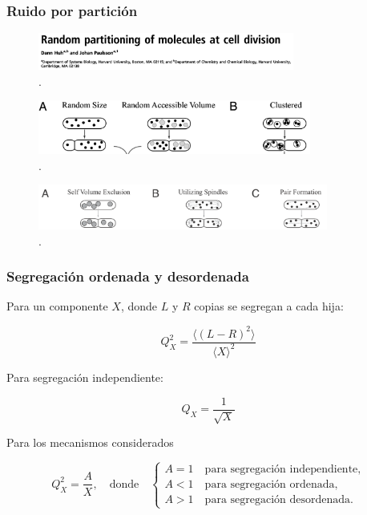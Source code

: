 \documentclass[xcolor=dvipsnames]{beamer}
\begin{document}
\begin{frame}
\frametitle{Ruido por partici\'on}
\begin{figure}[p]
    \centering
    \includegraphics[width=0.75\textwidth]{huh11.png}\\
    \tiny \cite{huh11b}.
\end{figure}

\begin{figure}[p]
    \centering
    \includegraphics[width=0.8\textwidth]{order.png}\\
    \tiny \cite{huh11b}.
\end{figure}

\begin{figure}[p]
    \centering
    \includegraphics[width=0.85\textwidth]{disorder.png}\\
    \tiny \cite{huh11b}.
\end{figure}

\end{frame}

\begin{frame}
\frametitle{Segregaci\'on ordenada y desordenada}

Para un componente $X$, donde $L$ y $R$ copias se segregan a cada hija:

$$Q_X^2 = \frac{\langle (L-R)^2 \rangle}{\langle X \rangle^2} $$

Para segregaci\'on independiente:

$$Q_X = \frac{1}{\sqrt{X}} $$

Para los mecanismos considerados

$$ Q_X^2 = \frac{A}{X}, \quad \text{donde} \quad 
\begin{cases}
A = 1 \quad \text{para segregaci\'on independiente,}\\
A < 1 \quad \text{para segregaci\'on ordenada,}\\
A > 1 \quad \text{para segregaci\'on desordenada.}
\end{cases} 
$$

\end{frame}
\end{document}
